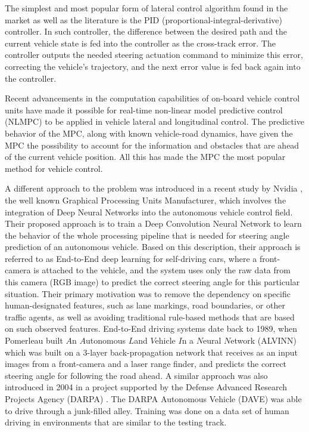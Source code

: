 The simplest and most popular form of lateral control algorithm found in the market as well as the literature is the PID (proportional-integral-derivative) controller\cite{pid}. In such controller, the difference between the desired path and the current vehicle state is fed into the controller as the cross-track error. The controller outputs the needed steering actuation command to minimize this error, correcting the vehicle's trajectory, and the next error value is fed back again into the controller.

Recent advancements in the computation capabilities of on-board vehicle control units have made it possible for real-time non-linear model predictive control (NLMPC) to be applied in vehicle lateral and longitudinal control. The predictive behavior of the MPC, along with known vehicle-road dynamics, have given the MPC the possibility to account for the information and obstacles that are ahead of the current vehicle position\cite{mpc}. All this has made the MPC the most popular method for vehicle control.

A different approach to the problem was introduced in a recent study by Nvidia \cite{nvidia}, the well known Graphical Processing Units Manufacturer, which involves the integration of Deep Neural Networks into the autonomous vehicle control field. Their proposed approach is to train a Deep Convolution Neural Network to learn the behavior of the whole processing pipeline that is needed for steering angle prediction of an autonomous vehicle. Based on this description, their approach is referred to as End-to-End deep learning for self-driving cars, where a front-camera is attached to the vehicle, and the system uses only the raw data from this camera (RGB image) to predict the correct steering angle for this particular situation. Their primary motivation was to remove the dependency on specific human-designated features, such as lane markings, road boundaries, or other traffic agents, as well as avoiding traditional rule-based methods that are based on such observed features. End-to-End driving systems date back to 1989, when Pomerleau built \(A\)n \(A\)utonomous \(L\)and \(V\)ehicle \(I\)n a \(N\)eural \(N\)etwork (ALVINN) \cite{alvinn} which was built on a 3-layer back-propagation network that receives as an input images from a front-camera and a laser range finder, and predicts the correct steering angle for following the road ahead. A similar approach was also introduced in 2004 in a project supported by the Defense Advanced Research Projects Agency (DARPA) \cite{dave}. The DARPA Autonomous Vehicle (DAVE) was able to drive through a junk-filled alley. Training was done on a data set of human driving in environments that are similar to the testing track.


